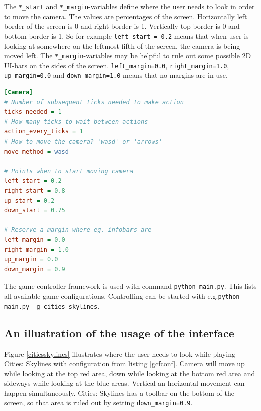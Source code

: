 \documentclass[english]{tktltiki}
\begin{document}
The \verb|*_start| and \verb|*_margin|-variables define where the user needs to look in order to move the camera. The values are percentages of the screen. Horizontally left border of the screen is 0 and right border is 1. Vertically top border is 0 and bottom border is 1. So for example \verb|left_start = 0.2| means that when user is looking at somewhere on the leftmost fifth of the screen, the camera is being moved left. The \verb|*_margin|-variables may be helpful to rule out some possible 2D UI-bars on the sides of the screen. \verb|left_margin=0.0|, \verb|right_margin=1.0|, \verb|up_margin=0.0| and \verb|down_margin=1.0| means that no margins are in use.

\bigskip
\begin{lstlisting}[language={Ini},caption={Example of game-specific configuration file},label={gcfconf}]
[Camera]
# Number of subsequent ticks needed to make action
ticks_needed = 1
# How many ticks to wait between actions
action_every_ticks = 1
# How to move the camera? 'wasd' or 'arrows'
move_method = wasd

# Points when to start moving camera
left_start = 0.2
right_start = 0.8
up_start = 0.2
down_start = 0.75

# Reserve a margin where eg. infobars are
left_margin = 0.0
right_margin = 1.0
up_margin = 0.0
down_margin = 0.9
\end{lstlisting}
\bigskip

The game controller framework is used with command \verb|python main.py|. This lists all available game configurations. Controlling can be started with e.g.\newline \verb|python main.py -g cities_skylines|.

\subsection{An illustration of the usage of the interface}

Figure \ref{citiesskylines} illustrates where the user needs to look while playing Cities: Skylines with configuration from listing \ref{gcfconf}. Camera will move up while looking at the top red area, down while looking at the bottom red area and sideways while looking at the blue areas. Vertical an horizontal movement can happen simultaneously. Cities: Skylines has a toolbar on the bottom of the screen, so that area is ruled out by setting \verb|down_margin=0.9|.
\end{document}
